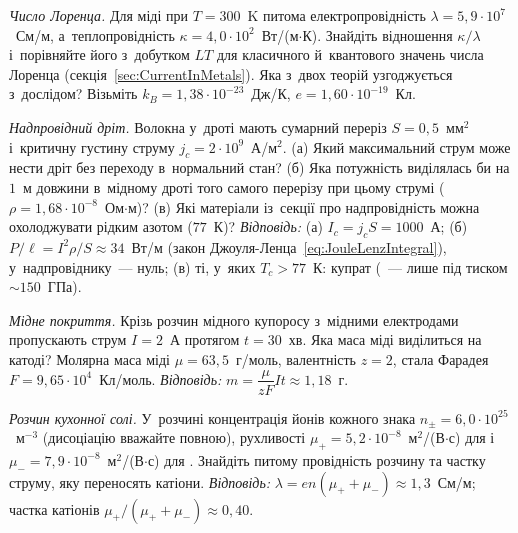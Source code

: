 \begin{problem}\label{prb:WiedemannFranz}
	\emph{Число Лоренца.} Для міді при $T=300$~K питома електропровідність
	$\lambda=5{,}9\cdot10^{7}$~См/м, а~теплопровідність
	$\kappa=4{,}0\cdot10^{2}$~Вт/(м$\cdot$К). Знайдіть відношення $\kappa/\lambda$
	і~порівняйте його з~добутком $LT$ для класичного й~квантового значень числа Лоренца
	(секція~\ref{sec:CurrentInMetals}). Яка з~двох теорій узгоджується з~дослідом?
	Візьміть $k_B=1{,}38\cdot10^{-23}$~Дж/К, $e=1{,}60\cdot10^{-19}$~Кл.
\end{problem}

\begin{problem}\label{prb:SuperconductingWire}
	\emph{Надпровідний дріт.} Волокна  у~дроті мають сумарний переріз
	$S=0{,}5$~мм$^2$ і~критичну густину струму $j_c=2\cdot10^{9}$~А/м$^2$. (а) Який
	максимальний струм може нести дріт без переходу в~нормальний стан? (б) Яка потужність
	виділялась би на $1$~м довжини в~мідному дроті того самого перерізу при цьому струмі
	($\rho=1{,}68\cdot10^{-8}$~Ом$\cdot$м)? (в) Які матеріали із~секції про надпровідність
	можна охолоджувати рідким азотом ($77$~К)? \emph{Відповідь:} (а) $I_c=j_cS=1000$~А;
	(б) $P/\ell=I^2\rho/S\approx34$~Вт/м (закон
	Джоуля-Ленца~\eqref{eq:JouleLenzIntegral}), у~надпровіднику~--- нуль; (в) ті, у~яких
	$T_c>77$~К: купрат  (~--- лише під тиском $\sim150$~ГПа).
\end{problem}

\begin{problem}\label{prb:ElectrolysisCopper}
	\emph{Мідне покриття.} Крізь розчин мідного купоросу  з~мідними електродами
	пропускають струм $I=2$~А протягом $t=30$~хв. Яка маса міді виділиться на катоді?
	Молярна маса міді $\mu=63{,}5$~г/моль, валентність $z=2$, стала Фарадея
	$F=9{,}65\cdot10^{4}$~Кл/моль. \emph{Відповідь:}
	$m=\dfrac{\mu}{zF}It\approx1{,}18$~г.
\end{problem}

\begin{problem}\label{prb:ElectrolyteConductivity}
	\emph{Розчин кухонної солі.} У~розчині  концентрація йонів кожного знака
	$n_\pm=6{,}0\cdot10^{25}$~м$^{-3}$ (дисоціацію вважайте повною), рухливості
	$\mu_+=5{,}2\cdot10^{-8}$~м$^2$/(В$\cdot$с) для 
	і~$\mu_-=7{,}9\cdot10^{-8}$~м$^2$/(В$\cdot$с) для . Знайдіть питому
	провідність розчину та частку струму, яку переносять катіони. \emph{Відповідь:}
	$\lambda=en(\mu_++\mu_-)\approx1{,}3$~См/м; частка катіонів
	$\mu_+/(\mu_++\mu_-)\approx0{,}40$.
\end{problem}

